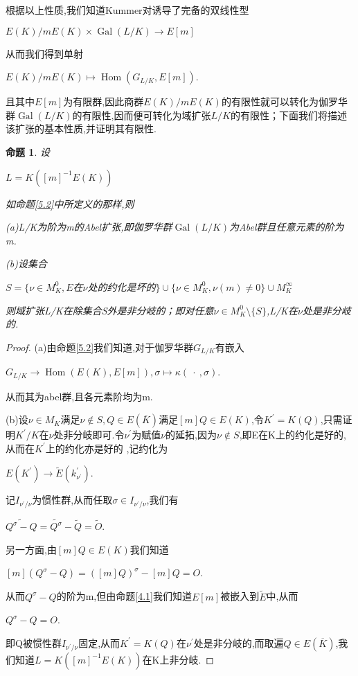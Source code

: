 \documentclass[11pt]{ctexart}
\DeclareMathOperator{\Hom}{Hom}
\DeclareMathOperator{\Gal}{Gal}
\newtheorem{pro}{命题}[section]
\begin{document}
根据以上性质,我们知道Kummer对诱导了完备的双线性型
\begin{center}
    $E(K)/mE(K)\times \Gal(L/K)\rightarrow E[m]$
\end{center}
 从而我们得到单射
 \begin{center}
    $E(K)/mE(K)\longmapsto \Hom(G_{L/K},E[m])$.
 \end{center}
且其中$E[m]$为有限群,因此商群$E(K)/mE(K)$的有限性就可以转化为伽罗华群$\Gal(L/K)$的有限性,因而便可转化为域扩张$L/K$的有限性；下面我们将描述该扩张的基本性质,并证明其有限性.

\begin{pro}设\label{5.3}
\begin{center}
    $L=K([m]^{-1}E(K))$
\end{center}
如命题\ref{5.2}中所定义的那样,则

(a)L/K为阶为m的Abel扩张,即伽罗华群$\Gal(L/K)$为Abel群且任意元素的阶为m.

(b)设集合
\begin{center}
    $S=\{\nu \in M^0_K,E$在$\nu$处的约化是坏的$\}\cup \{\nu \in M^0_K,\nu(m)\neq 0\}\cup M_K^{\infty}$
\end{center}
则域扩张L/K在除集合S外是非分岐的；即对任意$\nu \in M^0_K\setminus  \{S\}$,L/K在$\nu$处是非分岐的.



\end{pro}
\begin{proof}(a)由命题\ref{5.2}我们知道,对于伽罗华群$G_{L/K}$有嵌入
\begin{center}
    $G_{L/K}\rightarrow \Hom(E(K),E[m]),\sigma \mapsto \kappa(~·~,\sigma)$.
\end{center}
从而其为abel群,且各元素阶均为m.

\noindent (b)设$\nu \in M_{K}$满足$\nu \notin S$$,Q\in E(\overline{K})$满足$[m]Q\in E(K)$,令$K^{\prime}=K(Q)$,只需证明$K^{\prime}/K$在$\nu$处非分岐即可.令$\nu^{\prime}$为赋值$\nu$的延拓,因为$\nu \notin S$,即E在K上的约化是好的,从而在$K^{\prime}$上的约化亦是好的
,记约化为
\begin{center}
    $E(K^{\prime})\rightarrow \widetilde{E}(k^{\prime}_{\nu^{\prime}})$.
\end{center}
记$I_{\nu^{\prime}/\nu}$为惯性群,从而任取$\sigma \in I_{\nu^{\prime}/\nu} $,我们有
\begin{center}
    $\widetilde{Q^{\sigma}-Q}=\widetilde{Q^{\sigma}}-\widetilde{Q}=\widetilde{O}$. 
\end{center}
另一方面,由$[m]Q \in E(K)$我们知道
\begin{center}
    $[m](Q^{\sigma}-Q)=([m]Q)^{\sigma}-[m]Q=O$.
\end{center}
从而$Q^{\sigma}-Q$的阶为m,但由命题\ref{4.1}我们知道$E[m]$被嵌入到$\widetilde{E}$中,从而
\begin{center}
    $Q^{\sigma}-Q=O$.
\end{center}
即Q被惯性群$I_{\nu^{\prime}/\nu}$固定,从而$K^{\prime}=K(Q)$在$\nu^{\prime}$处是非分岐的,而取遍$Q \in E(\overline{K})$,我们知道$L=K([m]^{-1}E(K))$在K上非分岐.
\end{proof}
\end{document}
